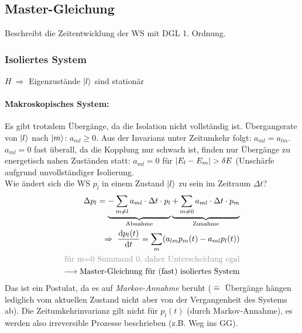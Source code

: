 \subsection{Master-Gleichung} 
Beschreibt die Zeitentwicklung der WS mit DGL 1. Ordnung.
\subsubsection*{Isoliertes System} $H \ \Rightarrow$ Eigenzustände $\ket{l}$ sind stationär

\paragraph{Makroskopisches System:} Es gibt trotzdem Übergänge, da die Isolation nicht vollständig ist. Übergangsrate von $\ket{l}$ nach $\ket{m}$: $a_{ml} \geq 0$. Aus der Invarianz unter Zeitumkehr folgt: $a_{ml} = a_{lm}$. $a_{ml} = 0$ fast überall, da die Kopplung nur schwach ist, finden nur Übergänge zu energetisch nahen Zuständen statt: $a_{ml} = 0$ für $\abs{E_l-E_m}> \delta E$ (Unschärfe aufgrund unvollständiger Isolierung.\\
Wie ändert sich die WS $p_l$ in einem Zustand $\ket{l}$ zu sein im Zeitraum $\Delta t$?
\begin{align}
    \Delta p_l = \underbrace{- \sum_{m \neq l} a_{ml} \cdot \Delta t\cdot p_l}_{\text{Abnahme}} \underbrace{+ \sum_{m \neq 0} a_{ml} \cdot \Delta t \cdot p_m}_{\text{Zunahme}} \\
    \Rightarrow \ \dv{p_l(t)}{t} = \sum_m (a_{lm} p_m(t) - a_{ml} p_l(t))\\
    \color{black!40} \text{für m=0 Summand 0, daher Unterscheidung egal}\\
    \longrightarrow \text{Master-Gleichung für (fast) isoliertes System}
\end{align}
Das ist ein Postulat, da es auf \emph{Markov-Annahme} beruht ($\widehat{=}$ Übergänge hängen lediglich vom aktuellen Zustand nicht aber von der Vergangenheit des Systems ab). Die Zeitumkehrinvarianz gilt nicht für $p_l(t)$ (durch Markov-Annahme), es werden also irreversible Prozesse beschrieben (z.B. Weg ins GG).

